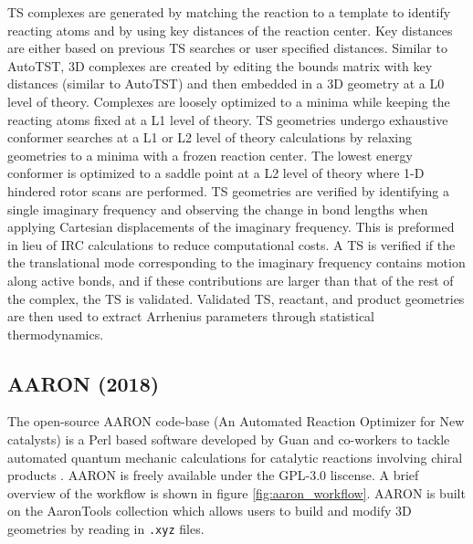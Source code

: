 \documentclass[preprint, 11pt]{elsarticle} %
\begin{document}
TS complexes are generated by matching the reaction to a template to identify reacting atoms and by using key distances of the reaction center. 
Key distances are either based on previous TS searches or user specified distances.
Similar to AutoTST, 3D complexes are created by editing the bounds matrix with key distances (similar to AutoTST) and then embedded in  a 3D geometry at a L0 level of theory.
Complexes are loosely optimized to a minima while keeping the reacting atoms fixed at a L1 level of theory.
TS geometries undergo exhaustive conformer searches at a L1 or L2 level of theory calculations by relaxing geometries to a minima with a frozen reaction center.
The lowest energy conformer is optimized to a saddle point at a L2 level of theory where 1-D hindered rotor scans are performed. 
TS geometries are verified by identifying a single imaginary frequency and observing the change in bond lengths when applying Cartesian displacements of the imaginary frequency.
This is preformed in lieu of  IRC calculations to reduce computational costs.
A TS is verified if the the translational mode corresponding to the imaginary frequency contains motion along active bonds, and if these contributions are larger than that of the rest of the complex, the TS is validated. 
Validated TS, reactant, and product geometries are then used to extract Arrhenius parameters through statistical thermodynamics.


\subsection{AARON (2018)}

The open-source AARON code-base (An Automated Reaction Optimizer for New catalysts) is a Perl based software developed by Guan and co-workers to tackle automated quantum mechanic calculations for catalytic reactions involving chiral products \cite{Guan:2018}. 
AARON is freely available under the GPL-3.0 liscense.
A brief overview of the workflow is shown in figure \ref{fig:aaron_workflow}.
AARON is built on the AaronTools \cite{aarontools:2018} collection which allows users to build and modify 3D geometries by reading in \texttt{.xyz} files.
\end{document}
